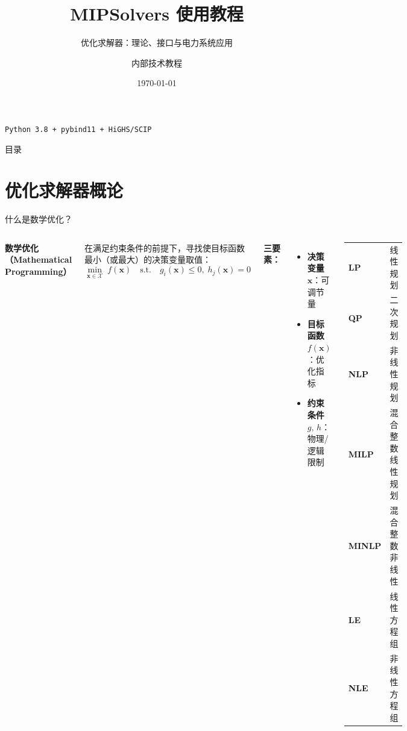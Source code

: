 \documentclass[10pt,aspectratio=169]{beamer}
\title{MIPSolvers 使用教程}
\subtitle{优化求解器：理论、接口与电力系统应用}
\author{内部技术教程}
\institute{MIPSolvers v0.1}
\date{\today}
\newcommand{\vx}{\bm{x}}
\begin{document}

\begin{frame}
  \titlepage
  \vfill
  \begin{center}
    \small\texttt{Python~3.8 + pybind11 + HiGHS/SCIP}
  \end{center}
\end{frame}

\begin{frame}{目录}
  \tableofcontents
\end{frame}

\section{优化求解器概论}

\begin{frame}{什么是数学优化？}
  \begin{columns}[T]
    \textbf{数学优化（Mathematical Programming）}
    \vspace{4pt}

    在满足约束条件的前提下，寻找使目标函数最小（或最大）的决策变量取值：
    \[
      \min_{\vx\in\mathcal{X}} \; f(\vx)
      \quad\text{s.t.}\quad
      g_i(\vx) \le 0,\;
      h_j(\vx) = 0
    \]

    \textbf{三要素：}
    \begin{itemize}
      \item \textbf{决策变量} $\vx$：可调节量
      \item \textbf{目标函数} $f(\vx)$：优化指标
      \item \textbf{约束条件} $g,\,h$：物理/逻辑限制
    \end{itemize}

    \begin{tcolorbox}[mybox,title=常见问题类型]
      \footnotesize
      \begin{tabular}{@{}ll@{}}
        \textbf{LP}   & 线性规划 \\[2pt]
        \textbf{QP}   & 二次规划 \\[2pt]
        \textbf{NLP}  & 非线性规划 \\[2pt]
        \textbf{MILP} & 混合整数线性规划 \\[2pt]
        \textbf{MINLP}& 混合整数非线性 \\[2pt]
        \textbf{LE}   & 线性方程组 \\[2pt]
        \textbf{NLE}  & 非线性方程组 \\
      \end{tabular}
    \end{tcolorbox}
  \end{columns}
\end{frame}
\end{document}

